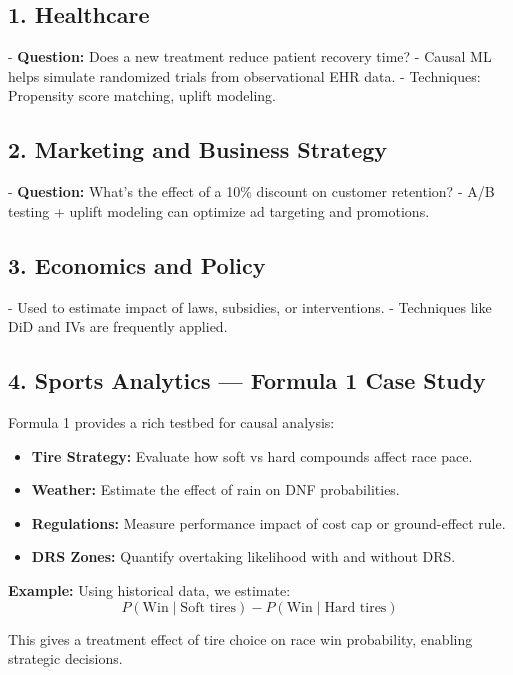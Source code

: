 \documentclass[12pt]{book}
\begin{document}
\subsection*{1. Healthcare}

- \textbf{Question:} Does a new treatment reduce patient recovery time?
- Causal ML helps simulate randomized trials from observational EHR data.
- Techniques: Propensity score matching, uplift modeling.

\subsection*{2. Marketing and Business Strategy}

- \textbf{Question:} What’s the effect of a 10\% discount on customer retention?
- A/B testing + uplift modeling can optimize ad targeting and promotions.

\subsection*{3. Economics and Policy}

- Used to estimate impact of laws, subsidies, or interventions.
- Techniques like DiD and IVs are frequently applied.

\subsection*{4. Sports Analytics — Formula 1 Case Study}

Formula 1 provides a rich testbed for causal analysis:

\begin{itemize}
    \item \textbf{Tire Strategy:} Evaluate how soft vs hard compounds affect race pace.
    \item \textbf{Weather:} Estimate the effect of rain on DNF probabilities.
    \item \textbf{Regulations:} Measure performance impact of cost cap or ground-effect rule.
    \item \textbf{DRS Zones:} Quantify overtaking likelihood with and without DRS.
\end{itemize}

\textbf{Example:} Using historical data, we estimate:
\[
P(\text{Win} \mid \text{Soft tires}) - P(\text{Win} \mid \text{Hard tires})
\]

This gives a treatment effect of tire choice on race win probability, enabling strategic decisions.
\end{document}
